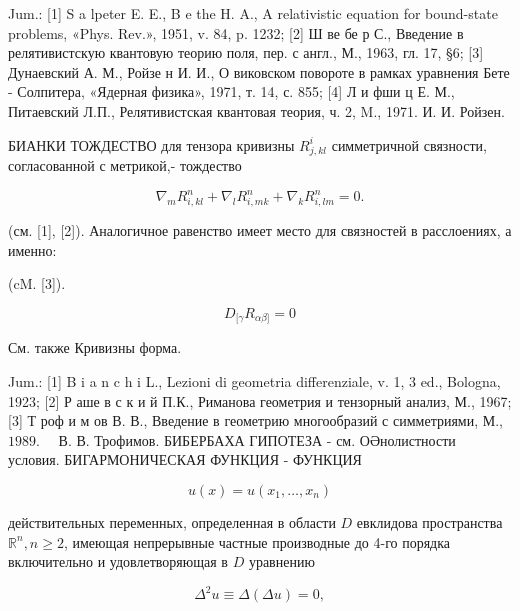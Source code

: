 \documentclass[10pt]{article}
\begin{document}
Jum.: [1] S a lpeter E. E., B e the H. A., A relativistic equation for bound-state problems, «Phys. Rev.», 1951, v. 84, p. 1232; [2] Ш ве бе р С., Введение в релятивистскую квантовую теорию поля, пер. с англ., М., 1963, гл. 17, §6; [3] Дунаевский А. М., Ройзе н И. И., О виковском повороте в рамках уравнения Бете - Солпитера, «Ядерная физика», 1971, т. 14, с. 855; [4] Л и фши ц Е. М., Питаевский Л.П., Релятивистская квантовая теория, ч. 2, M., 1971. И. И. Ройзен.



БИАНКИ ТОЖДЕСТВО для тензора кривизны $R_{j, k l}^{i}$ симметричной связности, согласованной с метрикой,- тождество



\[

\nabla_{m} R_{i, k l}^{n}+\nabla_{l} R_{i, m k}^{n}+\nabla_{k} R_{i, l m}^{n}=0 .

\]



(см. [1], [2]). Аналогичное равенство имеет место для связностей в расслоениях, а именно:



(cM. [3]).



\[

D_{[\gamma} R_{\alpha \beta]}=0

\]



См. также Кривизны форма.



Jum.: [1] B i a n c h i L., Lezioni di geometria differenziale, v. 1, 3 ed., Bologna, 1923; [2] Р аше в с к и й П.К., Риманова геометрия и тензорный анализ, М., 1967; [3] Т роф и м ов В. В., Введение в геометрию многообразий с симметриями, М., $1989 . \quad$ В. В. Трофимов. БИБЕРБАХА ГИПОТЕЗА - см. ОӘнолистности условия. БИГАРМОНИЧЕСКАЯ ФУНКЦИЯ - ФУНКЦИЯ



\[

u(x)=u\left(x_{1}, \ldots, x_{n}\right)

\]



действительных переменных, определенная в области $D$ евклидова пространства $\mathbb{R}^{n}, n \geqslant 2$, имеющая непрерывные частные производные до 4-го порядка включительно и удовлетворяющая в $D$ уравнению



\[

\Delta^{2} u \equiv \Delta(\Delta u)=0,

\]
\end{document}
